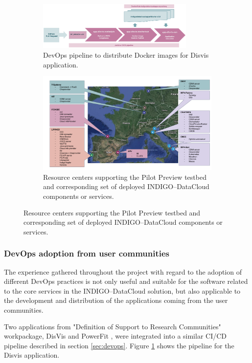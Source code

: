 \documentclass[journal]{IEEEtran}
\begin{document}
\begin{figure}	
	\centering
	\begin{subfigure}
		\centering
\includegraphics[width=0.85\textwidth]{images/disvis-flow.png}
\caption{DevOps pipeline to distribute Docker images for Disvis application.}
\label{fig:fig_disvis}		
	\end{subfigure}
	\quad
	\begin{subfigure}
		\centering
\includegraphics[width=\textwidth]{images/pilotpreview.png}
\caption{Resource centers supporting the Pilot Preview testbed and corresponding
set of deployed INDIGO--DataCloud components or services.}
\label{fig:fig_pilotpreview}
	\end{subfigure}
\end{figure}


\subsubsection{DevOps adoption from user communities}

The experience gathered throughout the project with regard to the adoption of
different DevOps practices is not only useful and suitable for the software related
to the core services in the INDIGO--DataCloud solution, but also applicable to the
development and distribution of the applications coming from the user communities.

Two applications from "Definition of Support to Research Communities" workpackage, 
DisVis \cite{disvis} and PowerFit \cite{powerfit}, were
integrated into a similar CI/CD pipeline described in section \ref{sec:devops}.
Figure \ref{fig:fig_disvis} shows the pipeline for the Disvis application.
\end{document}
